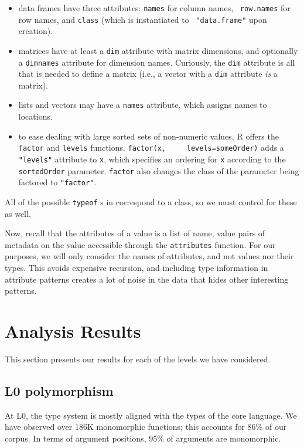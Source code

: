 \documentclass[acmsmall,10pt,review,anonymous]{acmart}\settopmatter{printfolios=true,printccs=false,printacmref=false}
\newcommand{\code}[1]{\lstinline|#1|\xspace}
\begin{document}
\begin{itemize}
\item data frames have three attributes: {\tt names} for column names, {\tt
  row.names} for row names, and {\tt class} (which is instantiated to {\tt
  "data.frame"} upon creation).
\item matrices have at least a {\tt dim} attribute with matrix dimensions,
  and optionally a {\tt dimnames} attribute for dimension names. Curiously,
  the {\tt dim} attribute is all that is needed to define a matrix (i.e., a
  vector with a {\tt dim} attribute {\it is} a matrix).
\item lists and vectors may have a {\tt names} attribute, which assigns
  names to locations.
\item to ease dealing with large sorted sets of non-numeric values, R offers
  the \code{factor} and \code{levels} functions.  \code{factor(x,
    levels=someOrder)} adds a {\tt "levels"} attribute to \code{x}, which
  specifies an ordering for \code{x} according to the \code{sortedOrder}
  parameter.  \code{factor} also changes the class of the parameter being
  factored to \texttt{"factor"}.
\end{itemize}

All of the possible \code{typeof}s in correspond to a class, so we must control
for these as well.

Now, recall that the attributes of a value is a list of name, value pairs of metadata
on the value accessible through the \code{attributes} function. For our purposes,
we will only consider the names of attributes, and not values nor their types. This
avoids expensive recursion, and including type information in attribute patterns 
creates a lot of noise in the data that hides other interesting patterns.

\section{Analysis Results}\label{sec:results}

This section presents our results for each of the levels we have considered.

\subsection{L0 polymorphism}

At L0, the type system is mostly aligned with the types of the core language.  We
have observed over 186K monomorphic functions; this accounts for 86\% of our
corpus.  In terms of argument positions, 95\% of arguments are monomorphic.
\end{document}
